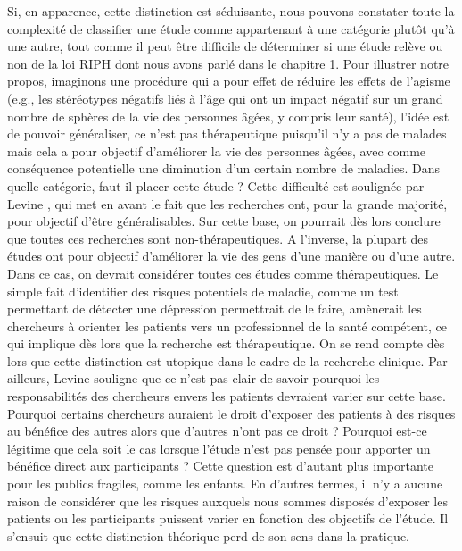 \documentclass[
  12pt,
]{book}
\begin{document}
Si, en apparence, cette distinction est séduisante, nous pouvons constater toute la complexité de classifier une étude comme appartenant à une catégorie plutôt qu'à une autre, tout comme il peut être difficile de déterminer si une étude relève ou non de la loi RIPH dont nous avons parlé dans le chapitre 1. Pour illustrer notre propos, imaginons une procédure qui a pour effet de réduire les effets de l'agisme (e.g., les stéréotypes négatifs liés à l'âge qui ont un impact négatif sur un grand nombre de sphères de la vie des personnes âgées, y compris leur santé), l'idée est de pouvoir généraliser, ce n'est pas thérapeutique puisqu'il n'y a pas de malades mais cela a pour objectif d'améliorer la vie des personnes âgées, avec comme conséquence potentielle une diminution d'un certain nombre de maladies. Dans quelle catégorie, faut-il placer cette étude ? Cette difficulté est soulignée par Levine \citep{Levine1988}, qui met en avant le fait que les recherches ont, pour la grande majorité, pour objectif d'être généralisables. Sur cette base, on pourrait dès lors conclure que toutes ces recherches sont non-thérapeutiques. A l'inverse, la plupart des études ont pour objectif d'améliorer la vie des gens d'une manière ou d'une autre. Dans ce cas, on devrait considérer toutes ces études comme thérapeutiques. Le simple fait d'identifier des risques potentiels de maladie, comme un test permettant de détecter une dépression permettrait de le faire, amènerait les chercheurs à orienter les patients vers un professionnel de la santé compétent, ce qui implique dès lors que la recherche est thérapeutique. On se rend compte dès lors que cette distinction est utopique dans le cadre de la recherche clinique. Par ailleurs, Levine souligne que ce n'est pas clair de savoir pourquoi les responsabilités des chercheurs envers les patients devraient varier sur cette base. Pourquoi certains chercheurs auraient le droit d'exposer des patients à des risques au bénéfice des autres alors que d'autres n'ont pas ce droit ? Pourquoi est-ce légitime que cela soit le cas lorsque l'étude n'est pas pensée pour apporter un bénéfice direct aux participants ? Cette question est d'autant plus importante pour les publics fragiles, comme les enfants. En d'autres termes, il n'y a aucune raison de considérer que les risques auxquels nous sommes disposés d'exposer les patients ou les participants puissent varier en fonction des objectifs de l'étude. Il s'ensuit que cette distinction théorique perd de son sens dans la pratique.
\end{document}
